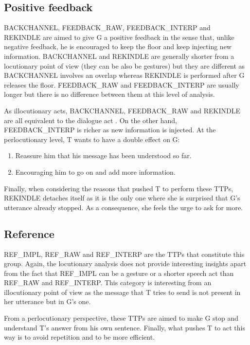     \subsection{Positive feedback}
		
					BACKCHANNEL, FEEDBACK\_RAW, FEEDBACK\_INTERP and REKINDLE are aimed to give G a positive feedback in the sense that, unlike negative feedback, he is encouraged to keep the floor and keep injecting new information. BACKCHANNEL and REKINDLE are generally shorter from a locutionary point of view (they can be also be gestures) but they are different as BACKCHANNEL involves an overlap whereas REKINDLE is performed after G releases the floor. FEEDBACK\_RAW and FEEDBACK\_INTERP are usually longer but there is no difference between them at this level of analysis.
					
					As illocutionary acts, BACKCHANNEL, FEEDBACK\_RAW and REKINDLE are all equivalent to the dialogue act \cite{I understand what you said so far, please continue}. On the other hand, FEEDBACK\_INTERP is richer as new information is injected. At the perlocutionary level, T wants to have a double effect on G:
					\begin{enumerate}
						\item Reassure him that his message has been understood so far.
						\item Encouraging him to go on and add more information.
					\end{enumerate}
					
					Finally, when considering the reasons that pushed T to perform these TTPs, REKINDLE detaches itself as it is the only one where she is surprised that G's utterance already stopped. As a consequence, she feels the urge to ask for more.

    \subsection{Reference}
		
					REF\_IMPL, REF\_RAW and REF\_INTERP are the TTPs that constitute this group. Again, the locutionary analysis does not provide interesting insights apart from the fact that REF\_IMPL can be a gesture or a shorter speech act than REF\_RAW and REF\_INTERP. This category is interesting from an illocutionary point of view as the message that T tries to send is not present in her utterance but in G's one.
					
					From a perlocutionary perspective, these TTPs are aimed to make G stop and understand T's answer from his own sentence. Finally, what pushes T to act this way is to avoid repetition and to be more efficient.

